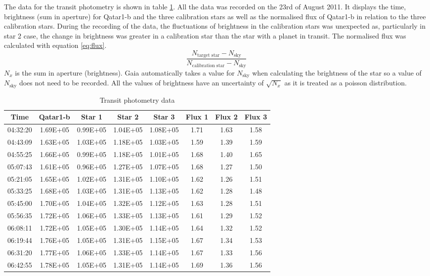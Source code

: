 \documentclass[10pt]{article}
\begin{document}
The data for the transit photometry is shown in table \ref{tab:transit}. All the data was recorded on the 23rd of August 2011. It displays the time, brightness (sum in aperture) for Qatar1-b and the three calibration stars as well as the normalised flux of Qatar1-b in relation to the three calibration stars. During the recording of the data, the fluctuations of brightness in the calibration stars was unexpected as, particularly in star 2 case, the change in brightness was greater in a calibration star than the star with a planet in transit. The normalised flux was calculated with equation \ref{eq:flux}.
\begin{equation}
	\frac{N_{\text{target star}}-N_{\text{sky}}}{N_{\text{calibration star}}-N_{\text{sky}}}
	\label{eq:flux}
\end{equation}
$N_x$ is the sum in aperture (brightness). Gaia automatically takes a value for $N_{\text{sky}}$ when calculating the brightness of the star so a value of $N_{\text{sky}}$ does not need to be recorded. All the values of brightness have an uncertainty of $\sqrt{N_x}$ as it is treated as a poisson distribution.

\begin{table}[!htb]
\centering
\caption{Transit photometry data}
\begin{tabular}{c|cccc|ccc}
\toprule
Time &  Qatar1-b &   Star 1 &   Star 2 &   Star 3 &   Flux 1 &   Flux 2 &   Flux 3 \\
\midrule
04:32:20 &  \num{1.69E+05} & \num{0.99E+05} & \num{1.04E+05} & \num{1.08E+05} & 1.71 & 1.63 & 1.58 \\
04:43:09 &  \num{1.63E+05} & \num{1.03E+05} & \num{1.18E+05} & \num{1.03E+05} & 1.59 & 1.39 & 1.59 \\
04:55:25 &  \num{1.66E+05} & \num{0.99E+05} & \num{1.18E+05} & \num{1.01E+05} & 1.68 & 1.40 & 1.65 \\
05:07:43 &  \num{1.61E+05} & \num{0.96E+05} & \num{1.27E+05} & \num{1.07E+05} & 1.68 & 1.27 & 1.50 \\
05:21:05 &  \num{1.65E+05} & \num{1.02E+05} & \num{1.31E+05} & \num{1.10E+05} & 1.62 & 1.26 & 1.51 \\
05:33:25 &  \num{1.68E+05} & \num{1.03E+05} & \num{1.31E+05} & \num{1.13E+05} & 1.62 & 1.28 & 1.48 \\
05:45:00 &  \num{1.70E+05} & \num{1.04E+05} & \num{1.32E+05} & \num{1.12E+05} & 1.63 & 1.28 & 1.51 \\
05:56:35 &  \num{1.72E+05} & \num{1.06E+05} & \num{1.33E+05} & \num{1.13E+05} & 1.61 & 1.29 & 1.52 \\
06:08:11 &  \num{1.72E+05} & \num{1.05E+05} & \num{1.30E+05} & \num{1.14E+05} & 1.64 & 1.32 & 1.52 \\
06:19:44 &  \num{1.76E+05} & \num{1.05E+05} & \num{1.31E+05} & \num{1.15E+05} & 1.67 & 1.34 & 1.53 \\
06:31:20 &  \num{1.77E+05} & \num{1.06E+05} & \num{1.33E+05} & \num{1.14E+05} & 1.67 & 1.33 & 1.56 \\
06:42:55 &  \num{1.78E+05} & \num{1.05E+05} & \num{1.31E+05} & \num{1.14E+05} & 1.69 & 1.36 & 1.56 \\
\bottomrule
\end{tabular}
\label{tab:transit}
\end{table}
\end{document}
